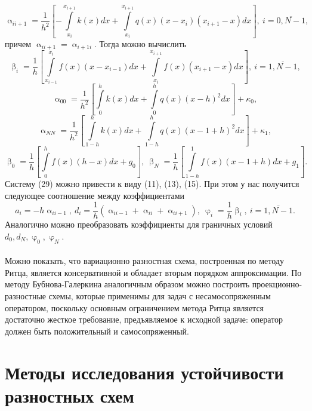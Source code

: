 \documentclass[a4paper, 12pt]{report}
\numberwithin{equation}{section}
\renewcommand{\alpha}{\upalpha}
\renewcommand{\beta}{\upbeta}
\renewcommand{\varphi}{\upvarphi}
\begin{document}
	$$\alpha_{ii+1} = \dfrac{1}{h^2} \left[-\int\limits_{x_i}^{x_{i+1}}k(x)dx + \int\limits_{x_i}^{x_{i+1}}q(x)(x-x_i)(x_{i+1} - x)dx\right],\ i = \overline {0, N-1},$$
	причем $\alpha_{ii+1} = \alpha_{i+1i}$. Тогда можно вычислить
	$$\beta_i = \dfrac{1}{h} \left[\int\limits_{x_{i-1}}^{x_i}f(x)(x-x_{i-1})dx + \int\limits_{x_i}^{x_{i+1}}f(x)(x_{i+1}-x)dx\right],\ i = \overline{1, N-1},$$
	$$\alpha_{00} = \dfrac{1}{h^2}\left[\int\limits_0^h k(x)dx + \int\limits_0^h q(x)(x-h)^2dx\right] + \kappa_0,$$
	$$\alpha_{NN} = \dfrac{1}{h^2}\left[\int\limits_{1-h}^h k(x)dx + \int\limits_{1-h}^h q(x)(x-1+h)^2dx\right] + \kappa_1,$$
	$$\beta_0 = \dfrac 1h \left[\int\limits_0^h f(x)(h-x)dx + g_0\right], \ \beta_N = \dfrac{1}{h} \left[\int\limits_{1-h}^1 f(x)(x-1+h)dx + g_1\right].$$
	Систему (29) можно привести к виду (11), (13), (15). При этом у нас получится следующее соотношение между коэффициентами
	$$a_i = - h\alpha_{ii-1},\ d_i = \dfrac 1h (\alpha_{ii-1} + \alpha_{ii} + \alpha_{ii+1}),\ \varphi_i = \dfrac 1h \beta_i,\ i=\overline{1, N-1}.$$
	Аналогично можно преобразовать коэффициенты для граничных условий $d_0, d_N, \varphi_0, \varphi_N$. \\\\
	Можно показать, что вариационно разностная схема, построенная по методу Ритца, является консервативной и обладает вторым порядком аппроксимации. По методу Бубнова-Галеркина аналогичным образом можно построить проекционно-разностные схемы, которые применимы для задач с несамосопряженным оператором, поскольку основным ограничением метода Ритца является достаточно жесткое требование, предъявляемое к исходной задаче: оператор должен быть положительный и самосопряженный. 
	\section{Методы исследования устойчивости разностных схем}
\end{document}
